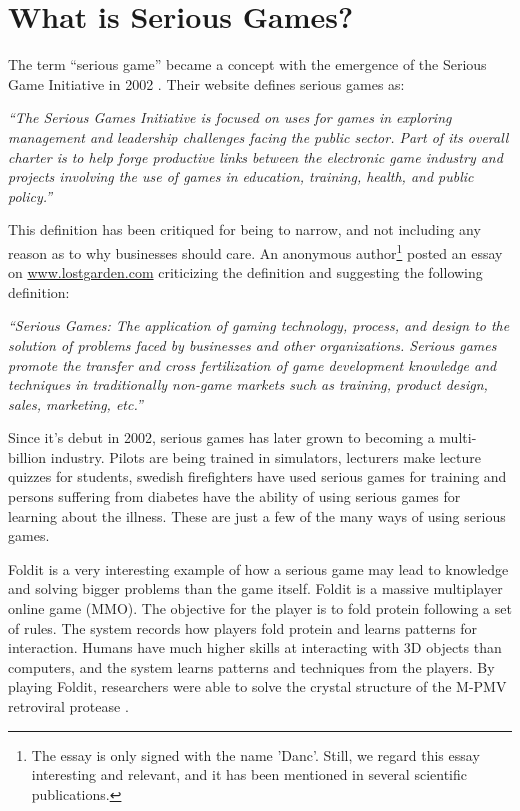 \section{What is Serious Games?}

The term ``serious game'' became a concept with the emergence of the Serious Game Initiative in 2002 \cite{seriousgamesinitative}. Their website defines serious games as: 

\textit{``The Serious Games Initiative is focused on uses for games in exploring management and leadership challenges facing the public sector. Part of its overall charter is to help forge productive links between the electronic game industry and projects involving the use of games in education, training, health, and public policy.''} 

This definition has been critiqued for being to narrow, and not including any reason as to why businesses should care. An anonymous author\footnote{The essay is only signed with the name 'Danc'. Still, we regard this essay interesting and relevant, and it has been mentioned in several scientific publications.} posted an essay on \url{www.lostgarden.com} criticizing the definition and suggesting the following definition:

\textit{``Serious Games: The application of gaming technology, process, and design to the solution of problems faced by businesses and other organizations. Serious games promote the transfer and cross fertilization of game development knowledge and techniques in traditionally non-game markets such as training, product design, sales, marketing, etc.''}


Since it's debut in 2002, serious games has later grown to becoming a multi-billion industry.
Pilots are being trained in simulators, lecturers make lecture quizzes for students\cite{wang2007lecture}, swedish firefighters have used serious games for training \cite{lebram2009design} and persons suffering from diabetes have the ability of using serious games for learning about the illness. These are just a few of the many ways of using serious games. 

Foldit is a very interesting example of how a serious game may lead to knowledge and solving bigger problems than the game itself\cite{cooper2010predicting}. Foldit is a massive multiplayer online game (MMO). The objective for the player is to fold protein following a set of rules. The system records how players fold protein and learns patterns for interaction. Humans have much higher skills at interacting with 3D objects than computers, and the system learns patterns and techniques from the players. By playing Foldit, researchers were able to solve the crystal structure of the M-PMV retroviral protease \cite{khatib2011crystal}.

